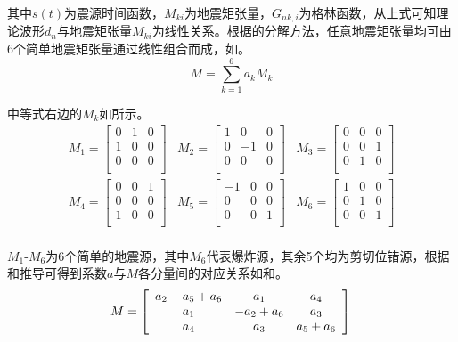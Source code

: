 其中$s(t)$为震源时间函数，$M_{ki}$为地震矩张量，$G_{nk,i}$为格林函数，从上式可知理论波形$d_n$与地震矩张量$M_{ki}$为线性关系。根据\citet{Kikuchi1991}的分解方法，任意地震矩张量均可由6个简单地震矩张量通过线性组合而成，如。
\begin{equation}
\label{eq2_02}
M=\sum_{k=1}^6a_kM_k
\end{equation}

中等式右边的$M_k$如所示。
\begin{equation}
\label{eq2_03}
\begin{array}{ccc}
M_1=\left[\begin{array}{ccc}
0 & 1 & 0\\
1 & 0 & 0\\
0 & 0 & 0\\
\end{array}\right]&
M_2=\left[\begin{array}{ccc}
1 & 0 & 0\\
0 & -1 & 0\\
0 & 0 & 0\\
\end{array}\right]&
M_3=\left[\begin{array}{ccc}
0 & 0 & 0\\
0 & 0 & 1\\
0 & 1 & 0\\
\end{array}\right]\\
M_4=\left[\begin{array}{ccc}
0 & 0 & 1\\
0 & 0 & 0\\
1 & 0 & 0\\
\end{array}\right]&
M_5=\left[\begin{array}{ccc}
-1 & 0 & 0\\
0 & 0 & 0\\
0 & 0 & 1\\
\end{array}\right]&
M_6=\left[\begin{array}{ccc}
1 & 0 & 0\\
0 & 1 & 0\\
0 & 0 & 1\\
\end{array}\right]\\
\end{array}
\end{equation}

$M_1$-$M_6$为6个简单的地震源，其中$M_6$代表爆炸源，其余5个均为剪切位错源，根据和推导可得到系数$a$与$M$各分量间的对应关系如和。
\begin{equation}
\label{eq2_04}
M=\left[\begin{array}{ccc}
a_2-a_5+a_6 & a_1 & a_4\\
a_1 & -a_2+a_6 & a_3\\
a_4 & a_3 & a_5+a_6\\
\end{array}\right]\\
\end{equation}

